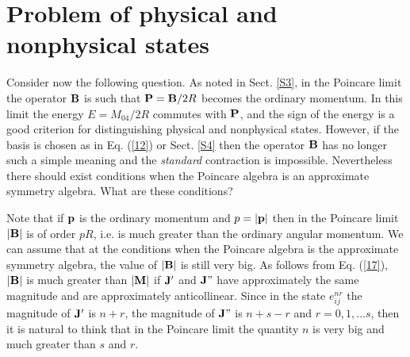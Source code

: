 \documentclass[a4paper,12pt]{article}%
\begin{document}
\section{Problem of physical and nonphysical states}
\label{Physical}

Consider now the following question. As noted in 
Sect. \ref{S3}, in the Poincare limit the 
operator ${\bf B}$ is such that ${\bf P}={\bf B}/2R$ 
becomes the ordinary momentum. In this limit
the energy $E=M_{04}/2R$ commutes with ${\bf P}$,
and the sign of the energy is a good criterion for
distinguishing physical and nonphysical states.
However, if the basis is chosen as in Eq. (\ref{12}) or 
Sect. \ref{S4} then the operator ${\bf B}$ has
no longer such a simple meaning and the {\it standard}
contraction is impossible. Nevertheless there should
exist conditions when the Poincare algebra is an
approximate symmetry algebra. What are these conditions?

Note that if ${\bf p}$ is the ordinary momentum
and $p=|{\bf p}|$ then in the Poincare limit 
$|{\bf B}|$ is of order $pR$, i.e. is much greater 
than the ordinary angular momentum. We can assume
that at the conditions when the Poincare algebra is
the approximate symmetry algebra, the value of
$|{\bf B}|$ is still very big.
As follows from Eq. (\ref{17}), $|{\bf B}|$ is 
much greater than $|{\bf M}|$ if ${\bf J}'$ 
and ${\bf J}"$ have approximately the same 
magnitude and are
approximately anticollinear. Since in the state
$e^{nr}_{ij}$ the magnitude of ${\bf J}'$ is 
$n+r$, the magnitude of ${\bf J}"$ is $n+s-r$
and $r=0,1,...s$, then it is natural to think
that in the Poincare limit the quantity $n$ is
very big and much greater than $s$ and $r$.
\end{document}
